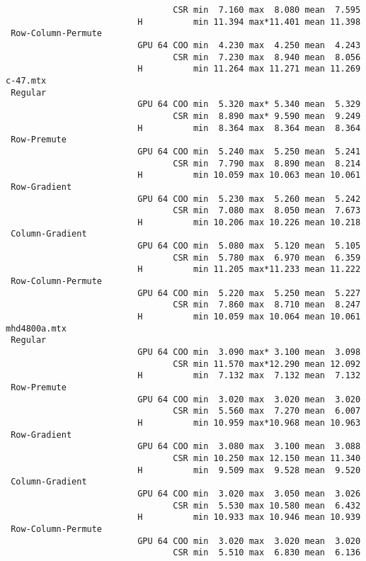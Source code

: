 {\begin{verbatim}
                                 CSR min  7.160 max  8.080 mean  7.595
                          H          min 11.394 max*11.401 mean 11.398
 Row-Column-Permute
                          GPU 64 COO min  4.230 max  4.250 mean  4.243
                                 CSR min  7.230 max  8.940 mean  8.056
                          H          min 11.264 max 11.271 mean 11.269
c-47.mtx
 Regular
                          GPU 64 COO min  5.320 max* 5.340 mean  5.329
                                 CSR min  8.890 max* 9.590 mean  9.249
                          H          min  8.364 max  8.364 mean  8.364
 Row-Premute
                          GPU 64 COO min  5.240 max  5.250 mean  5.241
                                 CSR min  7.790 max  8.890 mean  8.214
                          H          min 10.059 max 10.063 mean 10.061
 Row-Gradient
                          GPU 64 COO min  5.230 max  5.260 mean  5.242
                                 CSR min  7.080 max  8.050 mean  7.673
                          H          min 10.206 max 10.226 mean 10.218
 Column-Gradient
                          GPU 64 COO min  5.080 max  5.120 mean  5.105
                                 CSR min  5.780 max  6.970 mean  6.359
                          H          min 11.205 max*11.233 mean 11.222
 Row-Column-Permute
                          GPU 64 COO min  5.220 max  5.250 mean  5.227
                                 CSR min  7.860 max  8.710 mean  8.247
                          H          min 10.059 max 10.064 mean 10.061
mhd4800a.mtx
 Regular
                          GPU 64 COO min  3.090 max* 3.100 mean  3.098
                                 CSR min 11.570 max*12.290 mean 12.092
                          H          min  7.132 max  7.132 mean  7.132
 Row-Premute
                          GPU 64 COO min  3.020 max  3.020 mean  3.020
                                 CSR min  5.560 max  7.270 mean  6.007
                          H          min 10.959 max*10.968 mean 10.963
 Row-Gradient
                          GPU 64 COO min  3.080 max  3.100 mean  3.088
                                 CSR min 10.250 max 12.150 mean 11.340
                          H          min  9.509 max  9.528 mean  9.520
 Column-Gradient
                          GPU 64 COO min  3.020 max  3.050 mean  3.026
                                 CSR min  5.530 max 10.580 mean  6.432
                          H          min 10.933 max 10.946 mean 10.939
 Row-Column-Permute
                          GPU 64 COO min  3.020 max  3.020 mean  3.020
                                 CSR min  5.510 max  6.830 mean  6.136

\end{verbatim}}
